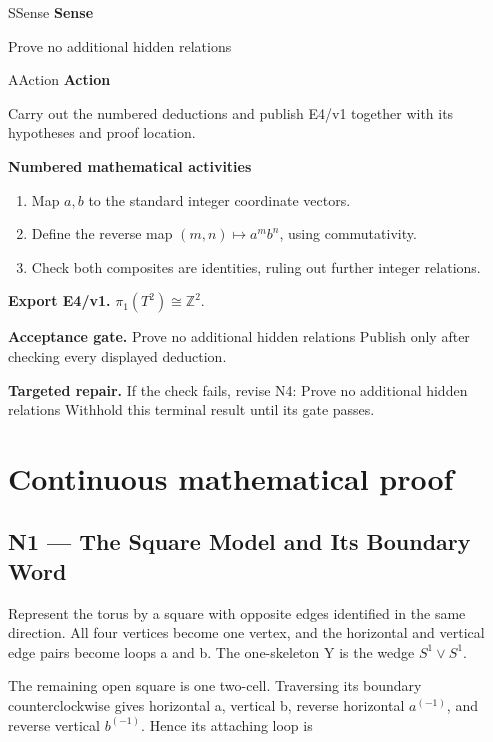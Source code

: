 \documentclass[preprint,12pt,aps,pra,showkeys,amsmath,amssymb,superscriptaddress,floatfix]{revtex4-2}
\theoremstyle{definition}
\theoremstyle{remark}
\newcommand{\mmfaculty}[3]{%
 \begin{mmfacultybox}{#1}{#2}
 {\sffamily\bfseries\color{MMBlue}#2}\par\smallskip #3
 \end{mmfacultybox}}
\newcommand{\field}[2]{\par\smallskip\noindent\textbf{#1.} #2\par}
\begin{document}
\mmfaculty{S}{Sense}{Prove no additional hidden relations}

\mmfaculty{A}{Action}{Carry out the numbered deductions and publish E4/v1 together with its
hypotheses and proof location.}

\smallskip\noindent\textbf{Numbered mathematical activities}

\begin{enumerate}[label=N4.\arabic*,leftmargin=3.4em]

\item Map \(a,b\) to the standard integer coordinate vectors.

\item Define the reverse map \((m,n)\mapsto a^mb^n\), using commutativity.

\item Check both composites are identities, ruling out further integer
relations.

\end{enumerate}

\field{Export E4/v1}{\(\pi_1(T^2)\cong\mathbb Z^2\).}

\field{Acceptance gate}{Prove no additional hidden relations Publish only after checking every
displayed deduction.}

\field{Targeted repair}{If the check fails, revise N4: Prove no additional hidden relations
Withhold this terminal result until its gate passes.}

\endgroup\clearpage\section{Continuous mathematical proof}\label{sec:proof}

\subsection{N1 --- The Square Model and Its Boundary
Word}\label{n1-the-square-model-and-its-boundary-word}

Represent the torus by a square with opposite edges identified in the
same direction. All four vertices become one vertex, and the horizontal
and vertical edge pairs become loops a and b. The one-skeleton Y is the
wedge \(S^1\vee S^1\).

The remaining open square is one two-cell. Traversing its boundary
counterclockwise gives horizontal a, vertical b, reverse horizontal
\(a^{(-1)}\), and reverse vertical \(b^{(-1)}\). Hence its attaching
loop is
\end{document}
